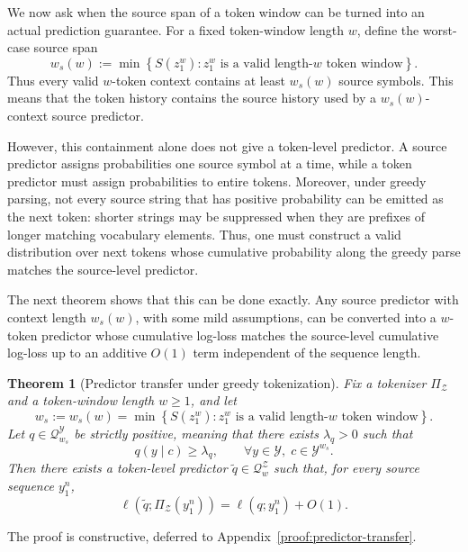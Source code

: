\documentclass{article}
\theoremstyle{plain}
\newtheorem{theorem}{Theorem}[section]
\theoremstyle{definition}
\theoremstyle{remark}
\begin{document}
    We now ask when the source span of a token window can be turned into an actual
    prediction guarantee. For a fixed token-window length $w$, define the worst-case
    source span
    \[
        w_s(w)
        :=
        \min\left\{
            S(z_1^w)
            :
            z_1^w \text{ is a valid length-$w$ token window}
        \right\}.
    \]
    Thus every valid $w$-token context contains at least $w_s(w)$ source symbols.
    This means that the token history contains the source history used by a
    $w_s(w)$-context source predictor.
    
    However, this containment alone does not give a token-level predictor. A source
    predictor assigns probabilities one source symbol at a time, while a token
    predictor must assign probabilities to entire tokens. Moreover, under greedy
    parsing, not every source string that has positive probability can be emitted as
    the next token: shorter strings may be suppressed when they are prefixes of
    longer matching vocabulary elements. Thus, one must construct a valid
    distribution over next tokens whose cumulative probability along the greedy
    parse matches the source-level predictor.
    
    The next theorem shows that this can be done exactly. Any source predictor with
    context length $w_s(w)$, with some mild assumptions, can be converted into a $w$-token predictor whose
    cumulative log-loss matches the source-level cumulative log-loss up to an
    additive $O(1)$ term independent of the sequence length.
    
    \begin{mainthmbox}
    \begin{theorem}[Predictor transfer under greedy tokenization]
    \label{thm:predictor_transfer}
    Fix a tokenizer $\Pi_{\mathcal{Z}}$ and a token-window length $w\ge 1$, and let
    \[
        w_s := w_s(w)
        =
        \min\left\{
            S(z_1^w)
            :
            z_1^w \text{ is a valid length-$w$ token window}
        \right\}.
    \]
    Let $q\in\mathcal{Q}_{w_s}^{\mathcal{Y}}$ be strictly positive, meaning that
    there exists $\lambda_q>0$ such that
    \[
        q(y\mid c)\ge \lambda_q,
        \qquad
        \forall y\in\mathcal Y,\; c\in\mathcal Y^{w_s}.
    \]
    Then there exists a token-level predictor
    $\tilde q\in\mathcal{Q}_w^{\mathcal{Z}}$ such that, for every source sequence
    $y_1^n$,
    \[
        \ell\!\left(\tilde q;\Pi_{\mathcal{Z}}(y_1^n)\right)
        =
        \ell(q;y_1^n)
        +
        O(1).
    \]
    \end{theorem}
    \end{mainthmbox}
    The proof is constructive, deferred to Appendix~\ref{proof:predictor-transfer}.
    
\end{document}
